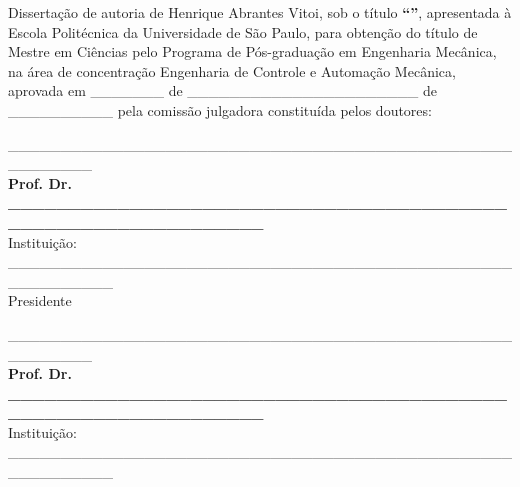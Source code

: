 \imprimircapa	%
\imprimirfolhaderosto*	%

\begin{fichacatalografica}
    
\end{fichacatalografica}

\begin{folhadeaprovacao}

	\noindent Dissertação de autoria de Henrique Abrantes Vitoi, sob o título \textbf{``\imprimirtitulo''}, apresentada à Escola Politécnica da Universidade de São Paulo, para obtenção do título de Mestre em Ciências pelo Programa de Pós-graduação em Engenharia Mecânica, na área de concentração Engenharia de Controle e Automação Mecânica, aprovada em \_\_\_\_\_\_\_ de \_\_\_\_\_\_\_\_\_\_\_\_\_\_\_\_\_\_\_\_\_\_ de \_\_\_\_\_\_\_\_\_\_ pela comissão julgadora constituída pelos doutores:
	\vspace*{3cm}
	\begin{center}
		\_\_\_\_\_\_\_\_\_\_\_\_\_\_\_\_\_\_\_\_\_\_\_\_\_\_\_\_\_\_\_\_\_\_\_\_\_\_\_\_\_\_\_\_\_\_\_\_\_\_\_\_\_\_\_\_
		\vspace*{0.2cm} 
		\\ \textbf{Prof. Dr. \_\_\_\_\_\_\_\_\_\_\_\_\_\_\_\_\_\_\_\_\_\_\_\_\_\_\_\_\_\_\_\_\_\_\_\_\_\_\_\_\_\_\_\_\_\_\_\_\_\_\_\_\_\_\_\_\_\_\_\_\_\_} 
		\\ \vspace*{0.2cm} 
		Instituição: \_\_\_\_\_\_\_\_\_\_\_\_\_\_\_\_\_\_\_\_\_\_\_\_\_\_\_\_\_\_\_\_\_\_\_\_\_\_\_\_\_\_\_\_\_\_\_\_\_\_\_\_\_\_\_\_\_\_ 
		\\ \vspace*{0.2cm}
		Presidente 

		\vspace*{2cm}

		\_\_\_\_\_\_\_\_\_\_\_\_\_\_\_\_\_\_\_\_\_\_\_\_\_\_\_\_\_\_\_\_\_\_\_\_\_\_\_\_\_\_\_\_\_\_\_\_\_\_\_\_\_\_\_\_
		\vspace*{0.2cm} 
		\\ \textbf{Prof. Dr. \_\_\_\_\_\_\_\_\_\_\_\_\_\_\_\_\_\_\_\_\_\_\_\_\_\_\_\_\_\_\_\_\_\_\_\_\_\_\_\_\_\_\_\_\_\_\_\_\_\_\_\_\_\_\_\_\_\_\_\_\_\_} 
		\\ \vspace*{0.2cm} 
		Instituição: \_\_\_\_\_\_\_\_\_\_\_\_\_\_\_\_\_\_\_\_\_\_\_\_\_\_\_\_\_\_\_\_\_\_\_\_\_\_\_\_\_\_\_\_\_\_\_\_\_\_\_\_\_\_\_\_\_\_

		\vspace*{2cm}


\end{center}
\end{folhadeaprovacao}
